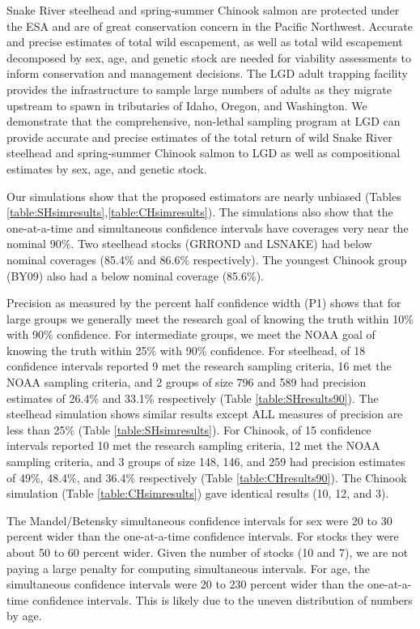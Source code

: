 \documentclass[%
                leqno,         %
%
]{nrc1}                          %
\begin{document}
Snake River steelhead and spring-summer Chinook salmon are protected under the ESA and are of great conservation concern in the Pacific Northwest. Accurate and precise estimates of total wild escapement, as well as total wild escapement decomposed by sex, age, and genetic stock are needed for viability assessments to inform conservation and management decisions. The LGD adult trapping facility provides the infrastructure to sample large numbers of adults as they migrate upstream to spawn in tributaries of Idaho, Oregon, and Washington. We demonstrate that the comprehensive, non-lethal sampling program at LGD can provide accurate and precise estimates of the total return of wild Snake River steelhead and spring-summer Chinook salmon to LGD as well as compositional estimates by sex, age, and genetic stock.

Our simulations show that the proposed estimators are nearly unbiased (Tables \ref{table:SHsimresults},\ref{table:CHsimresults}).  The simulations also show that the one-at-a-time and simultaneous confidence intervals have coverages very near the nominal 90\%.  Two steelhead stocks (GRROND and LSNAKE) had below nominal coverages (85.4\% and 86.6\% respectively).  The youngest Chinook group (BY09) also had a below nominal coverage (85.6\%).

Precision as measured by the percent half confidence width (P1) shows that for large groups we generally meet the research goal of knowing the truth within 10\% with 90\% confidence.  For intermediate groups, we meet the NOAA goal of knowing the truth within 25\% with 90\% confidence.  For steelhead, of 18 confidence intervals reported 9 met the research sampling criteria, 16 met the NOAA sampling criteria, and 2 groups of size 796 and 589 had precision estimates of 26.4\% and 33.1\%  respectively (Table \ref{table:SHresults90}). The steelhead simulation shows similar results except ALL measures of precision are less than 25\% (Table \ref{table:SHsimresults}). For Chinook, of 15 confidence intervals reported 10 met the research sampling criteria, 12 met the NOAA sampling criteria, and 3 groups of size 148, 146, and 259 had precision estimates of 49\%, 48.4\%, and 36.4\% respectively (Table \ref{table:CHresults90}).  The Chinook simulation (Table \ref{table:CHsimresults}) gave identical results (10, 12, and 3).

The Mandel/Betensky simultaneous confidence intervals for sex were 20 to 30 percent wider than the one-at-a-time confidence intervals.  For stocks they were about 50 to 60 percent wider.  Given the number of stocks (10 and 7), we are not paying a large penalty for computing simultaneous intervals.  For age, the simultaneous confidence intervals were 20 to 230 percent wider than the one-at-a-time confidence intervals. This is likely due to the uneven distribution of numbers by age.
\end{document}
